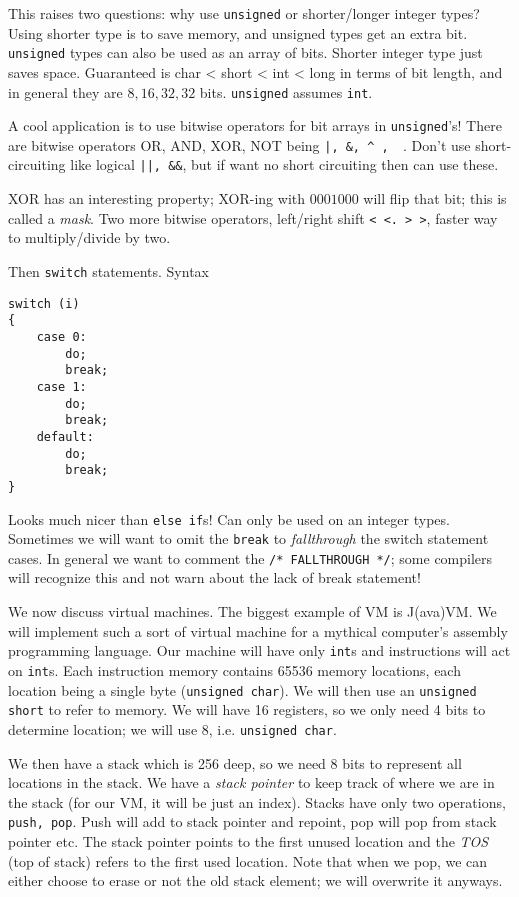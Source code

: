 \documentclass[10pt,landscape, twocolumn]{article}
\begin{document}
This raises two questions: why use \texttt{unsigned} or shorter/longer integer types? Using shorter type is to save memory, and unsigned types get an extra bit. \texttt{unsigned} types can also be used as an array of bits. Shorter integer type just saves space. Guaranteed is char < short < int < long in terms of bit length, and in general they are $8,16,32,32$ bits. \texttt{unsigned} assumes \texttt{int}.

A cool application is to use bitwise operators for bit arrays in \texttt{unsigned}'s! There are bitwise operators OR, AND, XOR, NOT being \texttt{|, \&, \^{} , ~}. Don't use short-circuiting like logical \texttt{||, \&\&}, but if want no short circuiting then can use these.

XOR has an interesting property; XOR-ing with $0001000$ will flip that bit; this is called a \emph{mask}. Two more bitwise operators, left/right shift \texttt{< <. > >}, faster way to multiply/divide by two.

Then \texttt{switch} statements. Syntax
\begin{verbatim}
switch (i)
{
    case 0:
        do;
        break;
    case 1:
        do;
        break;
    default:
        do;
        break;
}
\end{verbatim}

Looks much nicer than \texttt{else if}s! Can only be used on an integer types. Sometimes we will want to omit the \texttt{break} to \emph{fallthrough} the switch statement cases. In general we want to comment the \texttt{/* FALLTHROUGH */}; some compilers will recognize this and not warn about the lack of break statement!

We now discuss virtual machines. The biggest example of VM is J(ava)VM. We will implement such a sort of virtual machine for a mythical computer's assembly programming language. Our machine will have only \texttt{int}s and instructions will act on \texttt{int}s. Each instruction memory contains 65536 memory locations, each location being a single byte (\texttt{unsigned char}). We will then use an \texttt{unsigned short} to refer to memory. We will have 16 registers, so we only need 4 bits to determine location; we will use 8, i.e. \texttt{unsigned char}.

We then have a stack which is 256 deep, so we need 8 bits to represent all locations in the stack. We have a \emph{stack pointer} to keep track of where we are in the stack (for our VM, it will be just an index). Stacks have only two operations, \texttt{push, pop}. Push will add to stack pointer and repoint, pop will pop from stack pointer etc. The stack pointer points to the first unused location and the \emph{TOS} (top of stack) refers to the first used location. Note that when we pop, we can either choose to erase or not the old stack element; we will overwrite it anyways. 
\end{document}
